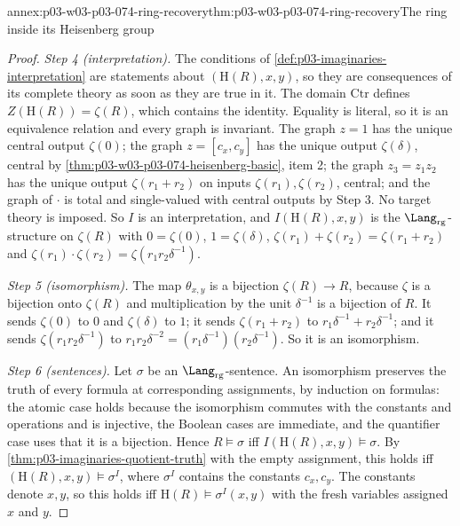 \begin{annexitem}{annex:p03-w03-p03-074-ring-recovery}{thm:p03-w03-p03-074-ring-recovery}{The ring inside its Heisenberg group}
\begin{proof}
\emph{Step 4 (interpretation).} The conditions of
\cref{def:p03-imaginaries-interpretation} are statements about
\((\mathrm H(R),x,y)\), so they are consequences of its complete theory
as soon as they are true in it. The domain \(\mathrm{Ctr}\) defines
\(Z(\mathrm H(R))=\zeta(R)\), which contains the identity. Equality is
literal, so it is an equivalence relation and every graph is invariant.
The graph \(z=1\) has the unique central output \(\zeta(0)\); the graph
\(z=[c_x,c_y]\) has the unique output \(\zeta(\delta)\), central by
\cref{thm:p03-w03-p03-074-heisenberg-basic}, item 2; the graph
\(z_3=z_1z_2\) has the unique output \(\zeta(r_1+r_2)\) on inputs
\(\zeta(r_1),\zeta(r_2)\), central; and the graph of \(\cdot\) is total and
single-valued with central outputs by Step 3. No target theory is imposed.
So \(I\) is an interpretation, and \(I(\mathrm H(R),x,y)\) is the
\(\Lang_{\mathrm{rg}}\)-structure on \(\zeta(R)\) with \(0=\zeta(0)\),
\(1=\zeta(\delta)\), \(\zeta(r_1)+\zeta(r_2)=\zeta(r_1+r_2)\) and
\(\zeta(r_1)\cdot\zeta(r_2)=\zeta(r_1r_2\delta^{-1})\).

\emph{Step 5 (isomorphism).} The map \(\theta_{x,y}\) is a bijection
\(\zeta(R)\to R\), because \(\zeta\) is a bijection onto \(\zeta(R)\) and
multiplication by the unit \(\delta^{-1}\) is a bijection of \(R\). It
sends \(\zeta(0)\) to \(0\) and \(\zeta(\delta)\) to \(1\); it sends
\(\zeta(r_1+r_2)\) to \(r_1\delta^{-1}+r_2\delta^{-1}\); and it sends
\(\zeta(r_1r_2\delta^{-1})\) to
\(r_1r_2\delta^{-2}=(r_1\delta^{-1})(r_2\delta^{-1})\). So it is an
isomorphism.

\emph{Step 6 (sentences).} Let \(\sigma\) be an
\(\Lang_{\mathrm{rg}}\)-sentence. An isomorphism preserves the truth of
every formula at corresponding assignments, by induction on formulas: the
atomic case holds because the isomorphism commutes with the constants and
operations and is injective, the Boolean cases are immediate, and the
quantifier case uses that it is a bijection. Hence \(R\models\sigma\) iff
\(I(\mathrm H(R),x,y)\models\sigma\). By
\cref{thm:p03-imaginaries-quotient-truth} with the empty assignment, this
holds iff \((\mathrm H(R),x,y)\models\sigma^I\), where \(\sigma^I\)
contains the constants \(c_x,c_y\). The constants denote \(x,y\), so this
holds iff \(\mathrm H(R)\models\sigma^I(x,y)\) with the fresh variables
assigned \(x\) and \(y\).
\end{proof}
\end{annexitem}

